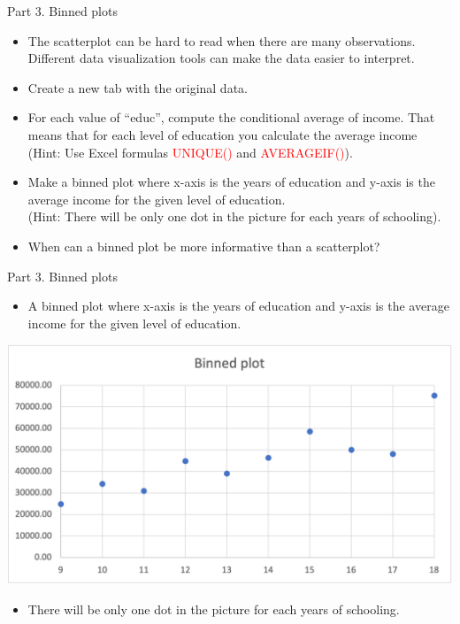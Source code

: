 \documentclass[
  10pt,
  ignorenonframetext,
]{beamer}
\providecommand{\tightlist}{%
  \setlength{\itemsep}{0pt}\setlength{\parskip}{0pt}}
\begin{document}
\begin{frame}{Part 3. Binned plots}
\protect\hypertarget{part-3.-binned-plots}{}
\begin{itemize}
\tightlist
\item
  The scatterplot can be hard to read when there are many observations.
  Different data visualization tools can make the data easier to
  interpret.
\item
  Create a new tab with the original data.
\item
  For each value of ``educ'', compute the conditional average of income.
  That means that for each level of education you calculate the average
  income\\
  (Hint: Use Excel formulas \textcolor{red}{UNIQUE()} and
  \textcolor{red}{AVERAGEIF()}).
\item
  Make a binned plot where x-axis is the years of education and y-axis
  is the average income for the given level of education.\\
  (Hint: There will be only one dot in the picture for each years of
  schooling).
\item
  When can a binned plot be more informative than a scatterplot?
\end{itemize}
\end{frame}

\begin{frame}{Part 3. Binned plots}
\protect\hypertarget{part-3.-binned-plots-1}{}
\begin{itemize}
\tightlist
\item
  A binned plot where x-axis is the years of education and y-axis is the
  average income for the given level of education.
\end{itemize}

\begin{center}\includegraphics[width=0.6\linewidth]{pictures/Ex2-BinnedPlot} \end{center}

\begin{itemize}
\tightlist
\item
  There will be only one dot in the picture for each years of schooling.
\end{itemize}
\end{frame}
\end{document}
